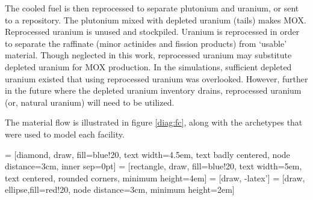 The cooled fuel is then reprocessed to separate plutonium and uranium,
or sent to a repository.
The plutonium mixed with depleted uranium (tails) makes \gls{MOX}.
Reprocessed uranium is unused and stockpiled. Uranium is reprocessed
in order to separate the raffinate (minor actinides and fission products)
from `usable' material. Though neglected in this work, reprocessed
uranium may substitute depleted uranium for \gls{MOX} production. In the
simulations, sufficient depleted uranium existed that using reprocessed
uranium was overlooked. However, further in the future where the depleted
uranium inventory drains, reprocessed uranium (or, natural uranium) will need to be utilized. 

The material flow is illustrated in figure \ref{diag:fc}, along with
the \Cyclus archetypes that were used to model each facility.



 = [diamond, draw, fill=blue!20, 
text width=4.5em, text badly centered, node distance=3cm, inner sep=0pt]
 = [rectangle, draw, fill=blue!20, 
text width=5em, text centered, rounded corners, minimum height=4em]
 = [draw, -latex']
 = [draw, ellipse,fill=red!20, node distance=3cm,
minimum height=2em]



